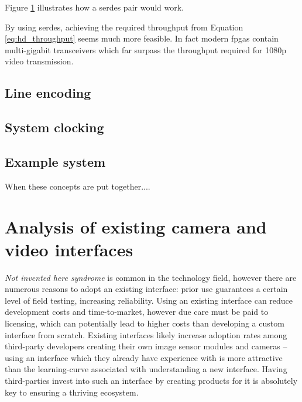 Figure \ref{} illustrates how a \gls{serdes} pair would work.

By using \gls{serdes}, achieving the required throughput from Equation \ref{eq:hd_throughput} seems much more feasible. In fact modern \glspl{fpga} contain multi-gigabit transceivers which far surpass the throughput required for 1080p video transmission.

\subsection{Line encoding}
\subsection{System clocking}

\subsection{Example system}
When these concepts are put together....


\section{Analysis of existing camera and video interfaces}
\textit{Not invented here syndrome} is common in the technology field, however there are numerous reasons to adopt an existing interface: prior use guarantees a certain level of field testing, increasing reliability. Using an existing interface can reduce development costs and time-to-market, however due care must be paid to licensing, which can potentially lead to higher costs than developing a custom interface from scratch. Existing interfaces likely increase adoption rates among third-party developers creating their own image sensor modules and cameras – using an interface which they already have experience with is more attractive than the learning-curve associated with understanding a new interface. Having third-parties invest into such an interface by creating products for it is absolutely key to ensuring a thriving ecosystem.

